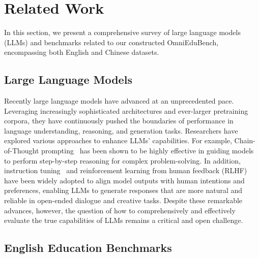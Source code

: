 \section{Related Work}

In this section, we present a comprehensive survey of large language models (LLMs) and benchmarks related to our constructed OmniEduBench, encompassing both English and Chinese datasets.

\subsection{Large Language Models}

Recently large language models have advanced at an unprecedented pace. Leveraging increasingly sophisticated architectures and ever-larger pretraining corpora, they have continuously pushed the boundaries of performance in language understanding, reasoning, and generation tasks. Researchers have explored various approaches to enhance LLMs’ capabilities. For example, Chain-of-Thought prompting~\citep{wei2022chain,qwq32b,seed2025seed-oss,guo2025deepseek,liu2024deepseek-v2} has been shown to be highly effective in guiding models to perform step-by-step reasoning for complex problem-solving. In addition, instruction tuning~\citep{dongerict,huadvancing,qwen2.5,yang2025qwen3} and reinforcement learning from human feedback (RLHF)~\citep{ouyang2022training,schulman2017proximal} have been widely adopted to align model outputs with human intentions and preferences, enabling LLMs to generate responses that are more natural and reliable in open-ended dialogue and creative tasks. Despite these remarkable advances, however, the question of how to comprehensively and effectively evaluate the true capabilities of LLMs remains a critical and open challenge.

\subsection{English Education Benchmarks}

